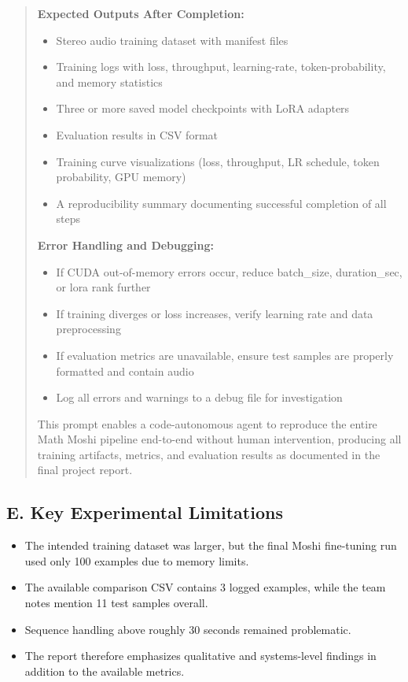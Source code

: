 \documentclass[12pt,a4paper]{article}
\begin{document}
\begin{quote}
{\textbf{Expected Outputs After Completion:}
\begin{itemize}
    \item Stereo audio training dataset with manifest files
    \item Training logs with loss, throughput, learning-rate, token-probability, and memory statistics
    \item Three or more saved model checkpoints with LoRA adapters
    \item Evaluation results in CSV format
    \item Training curve visualizations (loss, throughput, LR schedule, token probability, GPU memory)
    \item A reproducibility summary documenting successful completion of all steps
\end{itemize}

\textbf{Error Handling and Debugging:}
\begin{itemize}
    \item If CUDA out-of-memory errors occur, reduce batch\_size, duration\_sec, or lora rank further
    \item If training diverges or loss increases, verify learning rate and data preprocessing
    \item If evaluation metrics are unavailable, ensure test samples are properly formatted and contain audio
    \item Log all errors and warnings to a debug file for investigation
\end{itemize}

This prompt enables a code-autonomous agent to reproduce the entire Math Moshi pipeline end-to-end without human intervention, producing all training artifacts, metrics, and evaluation results as documented in the final project report.
}
\end{quote}

\subsection*{E. Key Experimental Limitations}
\begin{itemize}[leftmargin=1.5em]
    \item The intended training dataset was larger, but the final Moshi fine-tuning run used only 100 examples due to memory limits.
    \item The available comparison CSV contains 3 logged examples, while the team notes mention 11 test samples overall.
    \item Sequence handling above roughly 30 seconds remained problematic.
    \item The report therefore emphasizes qualitative and systems-level findings in addition to the available metrics.
\end{itemize}
\end{document}
